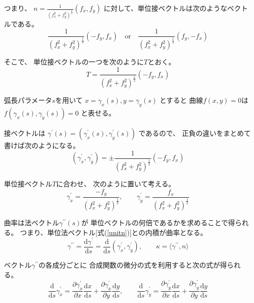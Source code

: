 \documentclass[12pt,b5paper]{ltjsarticle}
\begin{document}
\begin{enumerate}
      つまり、
      $n=\frac{1}{(f_{x}^2+f_{y}^2)^\frac{1}{2}}(f_{x},f_{y})$
      に対して、単位接ベクトルは次のようなベクトルである。
      \begin{equation}
       \frac{1}{(f_{x}^2+f_{y}^2)^\frac{1}{2}}(-f_{y},f_{x})
        \quad \text{or} \quad
       \frac{1}{(f_{x}^2+f_{y}^2)^\frac{1}{2}}(f_{y},-f_{x})
      \end{equation}

      そこで、
      単位接ベクトルの一つを次のように$T$とおく。
      \begin{equation}
       T=\frac{1}{(f_{x}^2+f_{y}^2)^\frac{1}{2}}(-f_{y},f_{x})
      \end{equation}
      

      弧長パラメータ$s$を用いて
      $x=\gamma_{x}(s),y=\gamma_{y}(s)$
      とすると
      曲線$f(x,y)=0$は
      $f(\gamma_{x}(s),\gamma_{y}(s))=0$
      と表せる。

      接ベクトルは
      $\gamma^{\prime}(s)=(\gamma_{x}^{\prime}(s),\gamma_{y}^{\prime}(s))$
      であるので、
      正負の違いをまとめて書けば次のようになる。
      \begin{equation}
       (\gamma_{x}^{\prime},\gamma_{y}^{\prime})
        =
        \pm\frac{1}{(f_{x}^2+f_{y}^2)^\frac{1}{2}}(-f_{y},f_{x})
      \end{equation}

      単位接ベクトル$T$に合わせ、
      次のように置いて考える。
      \begin{equation}
       \gamma_{x}^{\prime}
       =\frac{-f_{y}}{(f_{x}^2+f_{y}^2)^\frac{1}{2}}
       ,\qquad
       \gamma_{y}^{\prime}
       =\frac{f_{x}}{(f_{x}^2+f_{y}^2)^\frac{1}{2}}
       \label{diffxandy}
      \end{equation}

      曲率は法ベクトル$\gamma^{\prime\prime}(s)$が
      単位ベクトルの何倍であるかを求めることで得られる。
      つまり、単位法ベクトル[式(\ref{unitn})]との内積が曲率となる。
      \begin{equation}
       \gamma^{\prime\prime}
       = \frac{\mathrm{d}\gamma^{\prime}}{\mathrm{d}s}
       = \frac{\mathrm{d}}{\mathrm{d}s}
       \left(\gamma_{x}^{\prime},\gamma_{y}^{\prime}\right)
       ,\qquad
       \kappa = \langle \gamma^{\prime\prime}, n \rangle
      \end{equation}

      ベクトル$\gamma^{\prime\prime}$の各成分ごとに
      合成関数の微分の式を利用すると次の式が得られる。
      \begin{equation}
       \frac{\mathrm{d}}{\mathrm{d}s}\gamma_{x}^{\prime}
       = \frac{\partial \gamma_{x}^{\prime}}{\partial x}
       \frac{\mathrm{d}x}{\mathrm{d}s}
       + \frac{\partial \gamma_{x}^{\prime}}{\partial y}
       \frac{\mathrm{d}y}{\mathrm{d}s}
       ,\qquad
       \frac{\mathrm{d}}{\mathrm{d}s}\gamma_{y}^{\prime}
       = \frac{\partial \gamma_{y}^{\prime}}{\partial x}
       \frac{\mathrm{d}x}{\mathrm{d}s}
       + \frac{\partial \gamma_{y}^{\prime}}{\partial y}
       \frac{\mathrm{d}y}{\mathrm{d}s}
      \end{equation}


\end{enumerate}
\end{document}
